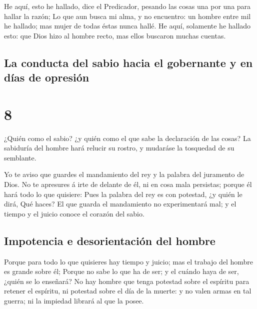  He aquí, esto he hallado, dice el Predicador, pesando
las cosas una por una para hallar la razón;  Lo que aun
busca mi alma, y no encuentro: un hombre entre mil he hallado; mas mujer
de todas éstas nunca hallé.  He aquí, solamente he
hallado esto: que Dios hizo al hombre recto, mas ellos buscaron muchas
cuentas.

\hypertarget{la-conducta-del-sabio-hacia-el-gobernante-y-en-duxedas-de-opresiuxf3n}{%
\subsection{La conducta del sabio hacia el gobernante y en días de
opresión}\label{la-conducta-del-sabio-hacia-el-gobernante-y-en-duxedas-de-opresiuxf3n}}

\hypertarget{section-21-8}{%
\section{8}\label{section-21-8}}

 ¿Quién como el sabio? ¿y quién como el que sabe la
declaración de las cosas? La sabiduría del hombre hará relucir su
rostro, y mudaráse la tosquedad de su semblante.

 Yo te aviso que guardes el mandamiento del rey y la
palabra del juramento de Dios.  No te apresures á irte de
delante de él, ni en cosa mala persistas; porque él hará todo lo que
quisiere:  Pues la palabra del rey es con potestad, ¿y
quién le dirá, Qué haces?  El que guarda el mandamiento no
experimentará mal; y el tiempo y el juicio conoce el corazón del sabio.

\hypertarget{impotencia-e-desorientaciuxf3n-del-hombre}{%
\subsection{Impotencia e desorientación del
hombre}\label{impotencia-e-desorientaciuxf3n-del-hombre}}

 Porque para todo lo que quisieres hay tiempo y juicio;
mas el trabajo del hombre es grande sobre él;  Porque no
sabe lo que ha de ser; y el cuándo haya de ser, ¿quién se lo enseñará?
 No hay hombre que tenga potestad sobre el espíritu para
retener el espíritu, ni potestad sobre el día de la muerte: y no valen
armas en tal guerra; ni la impiedad librará al que la posee.


